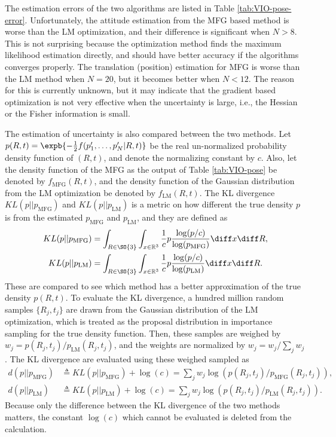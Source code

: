 The estimation errors of the two algorithms are listed in Table \ref{tab:VIO-pose-error}.
Unfortunately, the attitude estimation from the MFG based method is worse than the LM optimization, and their difference is significant when $N>8$.
This is not surprising because the optimization method finds the maximum likelihood estimation directly, and should have better accuracy if the algorithms converges properly.
The translation (position) estimation for MFG is worse than the LM method when $N=20$, but it becomes better when $N<12$.
The reason for this is currently unknown, but it may indicate that the gradient based optimization is not very effective when the uncertainty is large, i.e., the Hessian or the Fisher information is small.

The estimation of uncertainty is also compared between the two methods.
Let $p(R,t) = \expb{-\tfrac{1}{2} f(p'_1,\ldots,p'_N|R,t)}$ be the real un-normalized probability density function of $(R,t)$, and denote the normalizing constant by $c$.
Also, let the density function of the MFG as the output of Table \ref{tab:VIO-pose} be denoted by $f_\text{MFG}(R,t)$, and the density function of the Gaussian distribution from the LM optimization be denoted by $f_\text{LM}(R,t)$.
The KL divergence $KL(p||p_\text{MFG})$ and $KL(p||p_\text{LM})$ is a metric on how different the true density $p$ is from the estimated $p_\text{MFG}$ and $p_\text{LM}$, and they are defined as
\begin{align*}
	KL(p||p_\text{MFG}) &= \int_{R\in\SO{3}} \int_{x\in\mathbb{R}^3} \frac{1}{c}p \frac{\log(p/c)}{\log(p_\text{MFG})} \diff x \diff R, \\
	KL(p||p_\text{LM}) &= \int_{R\in\SO{3}} \int_{x\in\mathbb{R}^3} \frac{1}{c}p \frac{\log(p/c)}{\log(p_\text{LM})} \diff x \diff R.
\end{align*}
These are compared to see which method has a better approximation of the true density $p(R,t)$.
To evaluate the KL divergence, a hundred million random samples $\{R_j,t_j\}$ are drawn from the Gaussian distribution of the LM optimization, which is treated as the proposal distribution in importance sampling for the true density function.
Then, these samples are weighed by $w_j = p(R_j,t_j)/p_\text{LM}(R_j,t_j)$, and the weights are normalized by $w_j = w_j/\sum_{j} w_j$.
The KL divergence are evaluated using these weighed sampled as
\begin{align*}
	d(p||p_\text{MFG}) &\triangleq KL(p||p_\text{MFG}) + \log(c) = \sum_j w_j \log\left( p(R_j,t_j)/p_\text{MFG}(R_j,t_j) \right), \\
	d(p||p_\text{LM}) &\triangleq KL(p||p_\text{LM}) + \log(c) = \sum_j w_j \log\left( p(R_j,t_j)/p_\text{LM}(R_j,t_j) \right).
\end{align*}
Because only the difference between the KL divergence of the two methods matters, the constant $\log(c)$ which cannot be evaluated is deleted from the calculation.

